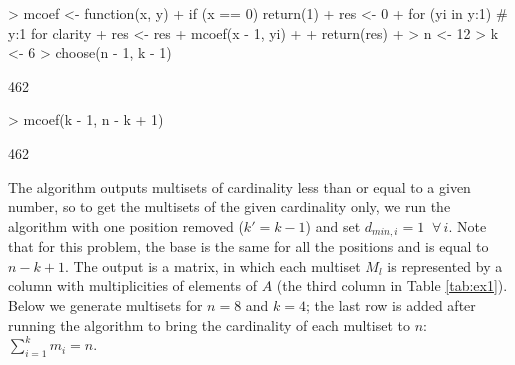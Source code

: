 \documentclass[11pt]{article}
\begin{document}
\begin{Schunk}
\begin{Sinput}
> mcoef <- function(x, y) {
+   if (x == 0) return(1)
+   res <- 0
+   for (yi in y:1) {                     # y:1 for clarity
+     res <- res + mcoef(x - 1, yi)
+   }
+   return(res)
+ }
> n <- 12
> k <- 6
> choose(n - 1, k - 1)
\end{Sinput}
\begin{Soutput}
[1] 462
\end{Soutput}
\begin{Sinput}
> mcoef(k - 1, n - k + 1)
\end{Sinput}
\begin{Soutput}
[1] 462
\end{Soutput}
\end{Schunk}

The algorithm outputs multisets of cardinality less than or equal to a given number, so to get the multisets of the given cardinality only, we run the algorithm with one position removed ($k' = k - 1$) and set $d_{min, i} = 1 \;\; \forall \, i$. Note that for this problem, the base is the same for all the positions and is equal to $n - k + 1$. The output is a matrix, in which each multiset $M_l$ is represented by a column with multiplicities of elements of $A$ (the third column in Table \ref{tab:ex1}). Below we generate multisets for $n = 8$ and $k = 4$; the last row is added after running the algorithm to bring the cardinality of each multiset to $n$: $\sum_{i = 1}^k m_i = n$. 
\end{document}
